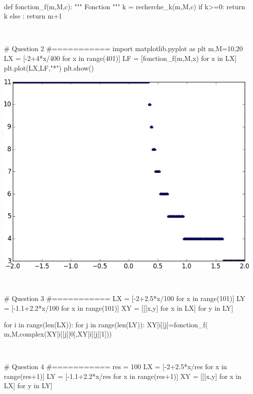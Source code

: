 \documentclass[10pt,fleqn]{article} %
\begin{document}
\begin{multicols}{2}
\begin{corrige}
$\quad$
\begin{python}
def fonction_f(m,M,c):
    """ Fonction """
    k = recherche_k(m,M,c)
    if k>=0:
        return k
    else :
        return m+1
\end{python}
\end{corrige}

\begin{corrige}
$\quad$
\begin{python}
# Question 2
#===========
import matplotlib.pyplot as plt
m,M=10,20
LX = [-2+4*x/400 for x in range(401)]
LF = [fonction_f(m,M,x) for x in LX]
plt.plot(LX,LF,"*")
plt.show()
\end{python}
\end{corrige}
\begin{center}
\includegraphics[width=.8\linewidth]{programmes/Exercice_09/figure_1}
\end{center}
\begin{corrige}
$\quad$
\begin{python}
# Question 3
#===========
LX = [-2+2.5*x/100 for x in range(101)]
LY = [-1.1+2.2*x/100 for x in range(101)]
XY = [[[x,y] for x in LX] for y in LY]

for i in range(len(LX)):
    for j in range(len(LY)):
        XY[i][j]=fonction_f(
            m,M,complex(XY[i][j][0],XY[i][j][1]))
\end{python}
\end{corrige}

\begin{corrige}
$\quad$
\begin{python}

# Question 4
#===========
res = 100
LX = [-2+2.5*x/res for x in range(res+1)]
LY = [-1.1+2.2*x/res for x in range(res+1)]
XY = [[[x,y] for x in LX] for y in LY]


\end{python}
\end{corrige}
\end{multicols}
\end{document}
